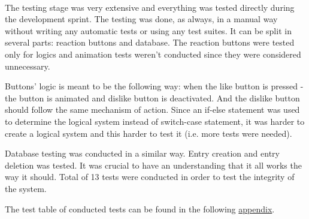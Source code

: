 \documentclass[12pt]{report}
\begin{document}
\paragraph{}
The testing stage was very extensive and everything was tested directly during the development sprint. 
The testing was done, as always, in a manual way without writing any automatic tests or using any test suites.
It can be split in several parts: reaction buttons and database. The reaction buttons were tested only for logics and
animation tests weren't conducted since they were considered unnecessary.

Buttons' logic is meant to be the following way: when the like button is pressed - the button is animated and dislike
button is deactivated. And the dislike button should follow the same mechanism of action. Since an if-else statement
was used to determine the logical system instead of switch-case statement, it was harder to create a logical system
and this harder to test it (i.e. more tests were needed).

Database testing was conducted in a similar way. Entry creation and entry deletion was tested. It was crucial to 
have an understanding that it all works the way it should. Total of 13 tests were conducted in order to test the integrity of the system.

The test table of conducted tests can be found in the following \hyperref[appendix:reaction_system_testing]{appendix}.
\end{document}
